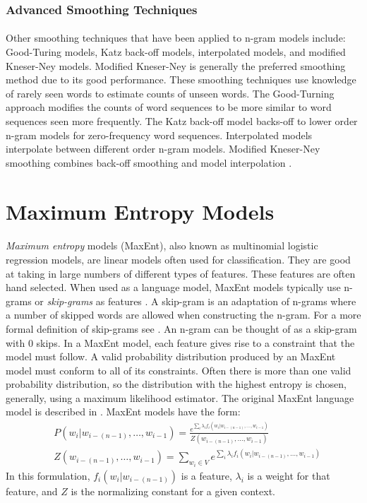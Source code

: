 \subsubsection{Advanced Smoothing Techniques}
\paragraph{}
 Other smoothing techniques that have been applied to n-gram models include: Good-Turing models, Katz back-off models, interpolated models, and modified Kneser-Ney models. Modified Kneser-Ney is generally the preferred smoothing method due to its good performance. These smoothing techniques use knowledge of rarely seen words to estimate counts of unseen words. The Good-Turning approach modifies the counts of word sequences to be more similar to word sequences seen more frequently. The Katz back-off model backs-off to lower order n-gram models for zero-frequency word sequences. Interpolated models interpolate between different order n-gram models. Modified Kneser-Ney smoothing combines back-off smoothing and model interpolation \cite{Jurafsky2009}.

\section{Maximum Entropy  Models}
\paragraph{}
\emph{Maximum entropy} models (MaxEnt), also known as multinomial logistic regression models, are linear models often used for classification. They are good at taking in large numbers of different types of features. These features are often hand selected. When used as a language model, MaxEnt models typically use n-grams or \emph{skip-grams} as features \cite{Mikolov2012}. A skip-gram is an adaptation of n-grams where a number of skipped words are allowed when constructing the n-gram. For a more formal definition of skip-grams see \cite{Guthrie2006}. An n-gram can be thought of as a skip-gram with 0 skips. In a MaxEnt model, each feature gives rise to a constraint that the model must follow. A valid probability distribution produced by an MaxEnt model must conform to all of its constraints. Often there is more than one valid probability distribution, so the distribution with the highest entropy is chosen, generally, using a maximum likelihood estimator. The original MaxEnt language model is described in \cite{Rosenfeld1994}.
MaxEnt models have the form:
\begin{align}
&P(w_i | w_{i-(n-1)},\dots, w_{i-1}) = \frac{e^{\sum_i \lambda_i f_i(w_i | w_{i-(n-1)},\dots, w_{i-1})}}{Z(w_{i-(n-1)},
\dots, w_{i-1})} \label{eq:maxent}
\\
&Z(w_{i-(n-1)},\dots, w_{i-1}) = \sum_{w_i \in V} e^{\sum_i \lambda_i f_i(w_i | w_{i-(n-1)},\dots, w_{i-1})} \nonumber
\end{align}
In this formulation, $f_i(w_i | w_{i-(n-1)})$ is a feature, $\lambda_i$ is a weight for that feature, and $Z$ is the normalizing constant for a given context.
